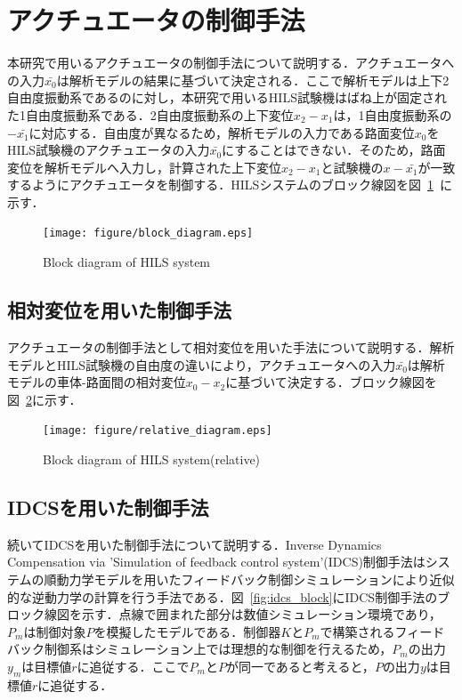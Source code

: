 \documentclass[a4paper,12pt]{article_vdlab_sotsuron}
\begin{document}
\newpage
\section{アクチュエータの制御手法}
本研究で用いるアクチュエータの制御手法について説明する．アクチュエータへの入力$\bar{x_0}$は解析モデルの結果に基づいて決定される．ここで解析モデルは上下2自由度振動系であるのに対し，本研究で用いるHILS試験機はばね上が固定された1自由度振動系である．2自由度振動系の上下変位$x_2-x_1$は，1自由度振動系の$-\bar{x_1}$に対応する．自由度が異なるため，解析モデルの入力である路面変位$x_0$をHILS試験機のアクチュエータの入力$\bar{x_0}$にすることはできない．そのため，路面変位を解析モデルへ入力し，計算された上下変位$x_2-x_1$と試験機の$x-\bar{x_1}$が一致するようにアクチュエータを制御する．HILSシステムのブロック線図を図~\ref{fig:block_diagram}~に示す．

\vspace*{7mm}
\begin{figure}[htp]
  \begin{center}
    \texttt{[image: figure/block\_diagram.eps]}
    \vspace*{3mm}
    \caption{Block diagram of HILS system}
    \label{fig:block_diagram}
  \end{center}
\end{figure}

\subsection{相対変位を用いた制御手法}
アクチュエータの制御手法として相対変位を用いた手法について説明する．解析モデルとHILS試験機の自由度の違いにより，アクチュエータへの入力$\bar{x_0}$は解析モデルの車体-路面間の相対変位$x_0-x_2$に基づいて決定する．ブロック線図を図~\ref{fig:relative_diagram}に示す．

\vspace*{7mm}
\begin{figure}[htp]
  \begin{center}
    \texttt{[image: figure/relative\_diagram.eps]}
    \vspace*{3mm}
    \caption{Block diagram of HILS system(relative)}
    \label{fig:relative_diagram}
  \end{center}
\end{figure}

\subsection{IDCSを用いた制御手法}
\label{sec:method_idcs}
続いてIDCSを用いた制御手法について説明する．Inverse Dynamics Compensation via 'Simulation of feedback control system'(IDCS)制御手法はシステムの順動力学モデルを用いたフィードバック制御シミュレーションにより近似的な逆動力学の計算を行う手法である\cite{method_idcs}．図~\ref{fig:idcs_block}にIDCS制御手法のブロック線図を示す．点線で囲まれた部分は数値シミュレーション環境であり，$P_m$は制御対象$P$を模擬したモデルである．制御器$K$と$P_m$で構築されるフィードバック制御系はシミュレーション上では理想的な制御を行えるため，$P_m$の出力$y_m$は目標値$r$に追従する．ここで$P_m$と$P$が同一であると考えると，$P$の出力$y$は目標値$r$に追従する．
\end{document}
